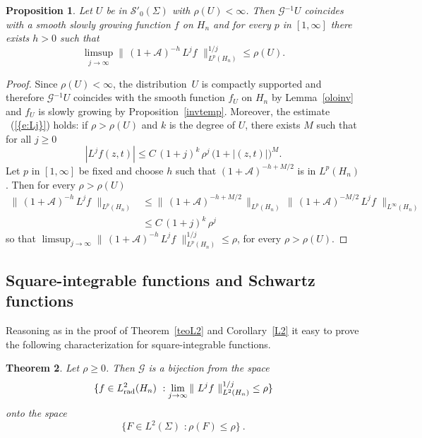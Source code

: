 \documentclass[12pt,a4paper]{amsart}
\theoremstyle{plain}
\newtheorem{theorem}{Theorem}[section]
\newtheorem{proposition}[theorem]{Proposition}
\theoremstyle{definition}
\numberwithin{equation}{section}
\begin{document}
 
  
 
 \begin{proposition}\label{limiteinv}
Let $U$ be in  ${\mathcal S}'_0({\Sigma})$ with ${\rho}(U)<\infty$. 
  Then    ${\mathcal G}{^{-1}} U$
  coincides with a smooth slowly growing  function 
  $f$ on ${{H_{n}}}$ and for every $p$ in $[1,\infty]$ there exists $h>0$ such that
$$
\limsup_{j\to\infty}
\|\,(1+{\mathcal A})^{-h}\,L^j f\,\,\|_{L^p({{H_{n}}})}^{1/j}
 \leq {\rho}(U) .
$$
\end{proposition}

  \begin{proof}
  Since ${\rho}(U)<\infty$, the distribution~$U$ is compactly supported
  and therefore  ${\mathcal G}{^{-1}} U$
  coincides with the smooth function $f_U$ on ${{H_{n}}}$ 
  by Lemma~\ref{oloinv} and $f_U$ is slowly growing by Proposition~\ref{invtemp}. 
 Moreover, the estimate {~(\ref{{e:Lj}})} holds: if $\rho>{\rho}(U)$ 
and $k$ is the degree of $U$, 
there exists $M$ such that for all $j\geq 0$ 
$$
 \left|
     L^j f(z,t)
     \right|
     \leq C \,(1+j)^k\, \rho^j\, \big(1+|(z,t)|\big)^{M}.
$$
Let $p$ in $[1,\infty]$ be fixed and choose $h$ such that $(1+{\mathcal A})^{-h+M/2}$ is in $L^p({{H_{n}}})$.
Then for every $\rho>\rho(U)$ 
\begin{align*}
\|\,(1+{\mathcal A})^{-h}\,L^j f\,\,\|_{L^p({{H_{n}}})}
&\leq \|\,(1+{\mathcal A})^{-h+M/2}\,\|_{L^p({{H_{n}}})} \, \|\,(1+{\mathcal A})^{-M/2}\,L^j f\,\,\|_{L^\infty({{H_{n}}})}
\\
&\leq C\,(1+j)^k\, \rho^j
\end{align*}
so that 
$
\limsup_{j\to\infty}
\|\,(1+{\mathcal A})^{-h}\,L^j f\,\,\|_{L^p({{H_{n}}})}^{1/j}
 \leq \rho 
$, for every  $\rho>{\rho}(U)$.
\end{proof}
 
\subsection{Square-integrable functions and Schwartz functions }

Reasoning as in the proof of Theorem~\ref{teoL2} and Corollary~\ref{L2} it easy to prove the following characterization for square-integrable functions.

\begin{theorem}\label{L2inv}
Let $\rho\geq 0$. Then  
${\mathcal G}$
is a bijection from the space 
 $$\{f\in{L^2_{\text{\rm rad}}({{H_{n}}})} 
\,\,: 
\lim_{j\to\infty} 
\|\,\,L^j f\,\,\|_{L^2({{H_{n}}})}^{1/j}
\leq \rho
\}$$
onto the space $$\{F\in L^2({\Sigma})
\,\,: \rho(F)
\leq \rho
\}\ .$$ 
\end{theorem}
\end{document}
